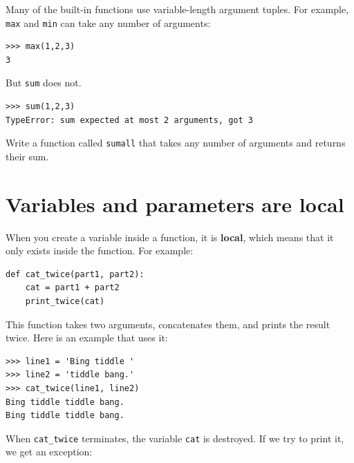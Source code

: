 \documentclass[10pt]{book}
\begin{document}
\begin{ex}
Many of the built-in functions use
variable-length argument tuples.  For example, {\tt max}
and {\tt min} can take any number of arguments:


\beforeverb
\begin{verbatim}
>>> max(1,2,3)
3
\end{verbatim}
\afterverb
%
But {\tt sum} does not.


\beforeverb
\begin{verbatim}
>>> sum(1,2,3)
TypeError: sum expected at most 2 arguments, got 3
\end{verbatim}
\afterverb
%
Write a function called {\tt sumall} that takes any number
of arguments and returns their sum.

\end{ex}



\section{Variables and parameters are local}

When you create a variable inside a function, it is {\bf local},
which means that it only
exists inside the function.  For example:


\beforeverb
\begin{verbatim}
def cat_twice(part1, part2):
    cat = part1 + part2
    print_twice(cat)
\end{verbatim}
\afterverb
%
This function takes two arguments, concatenates them, and prints
the result twice.  Here is an example that uses it:


\beforeverb
\begin{verbatim}
>>> line1 = 'Bing tiddle '
>>> line2 = 'tiddle bang.'
>>> cat_twice(line1, line2)
Bing tiddle tiddle bang.
Bing tiddle tiddle bang.
\end{verbatim}
\afterverb
%
When \verb"cat_twice" terminates, the variable {\tt cat}
is destroyed.  If we try to print it, we get an exception:

\end{document}
